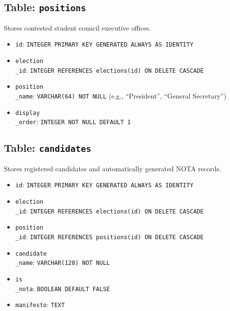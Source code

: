 \documentclass[12pt,a4paper,oneside]{report}
\begin{document}
\subsection{Table: \texttt{positions}}
Stores contested student council executive offices.
\begin{itemize}
    \item \texttt{id}: \texttt{INTEGER PRIMARY KEY GENERATED ALWAYS AS IDENTITY}
    \item \texttt{election\\_id}: \texttt{INTEGER REFERENCES elections(id) ON DELETE CASCADE}
    \item \texttt{position\\_name}: \texttt{VARCHAR(64) NOT NULL} (e.g., ``President'', ``General Secretary'')
    \item \texttt{display\\_order}: \texttt{INTEGER NOT NULL DEFAULT 1}
\end{itemize}

\subsection{Table: \texttt{candidates}}
Stores registered candidates and automatically generated NOTA records.
\begin{itemize}
    \item \texttt{id}: \texttt{INTEGER PRIMARY KEY GENERATED ALWAYS AS IDENTITY}
    \item \texttt{election\\_id}: \texttt{INTEGER REFERENCES elections(id) ON DELETE CASCADE}
    \item \texttt{position\\_id}: \texttt{INTEGER REFERENCES positions(id) ON DELETE CASCADE}
    \item \texttt{candidate\\_name}: \texttt{VARCHAR(128) NOT NULL}
    \item \texttt{is\\_nota}: \texttt{BOOLEAN DEFAULT FALSE}
    \item \texttt{manifesto}: \texttt{TEXT}
\end{itemize}
\end{document}
